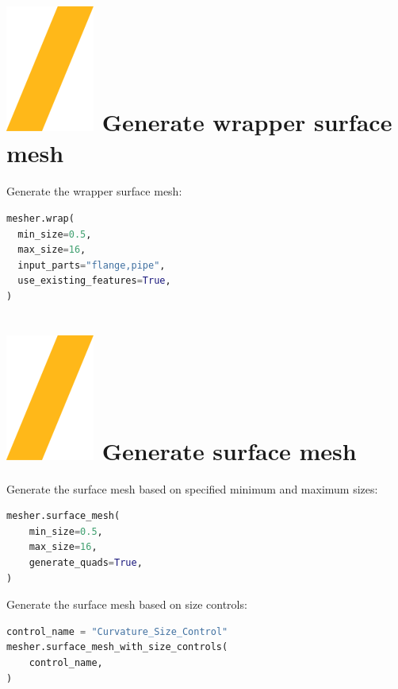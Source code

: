 \documentclass[9pt,landscape]{article}
\begin{document}
\begin{multicols}{3}
\section{\includegraphics[height=\fontcharht\font`\S]{slash.png} Generate wrapper surface mesh}
Generate the wrapper surface mesh:
\begin{lstlisting}[language=Python]
mesher.wrap(
  min_size=0.5,
  max_size=16,
  input_parts="flange,pipe",
  use_existing_features=True,
)
\end{lstlisting}

\section{\includegraphics[height=\fontcharht\font`\S]{slash.png} Generate surface mesh}
Generate the surface mesh based on specified minimum and maximum sizes: 
\begin{lstlisting}[language=Python]
mesher.surface_mesh(
    min_size=0.5,
    max_size=16,
    generate_quads=True,
)
\end{lstlisting}

Generate the surface mesh based on size controls:  
\begin{lstlisting}[language=Python]
control_name = "Curvature_Size_Control"
mesher.surface_mesh_with_size_controls(
    control_name,
)
\end{lstlisting}


\end{multicols}
\end{document}
